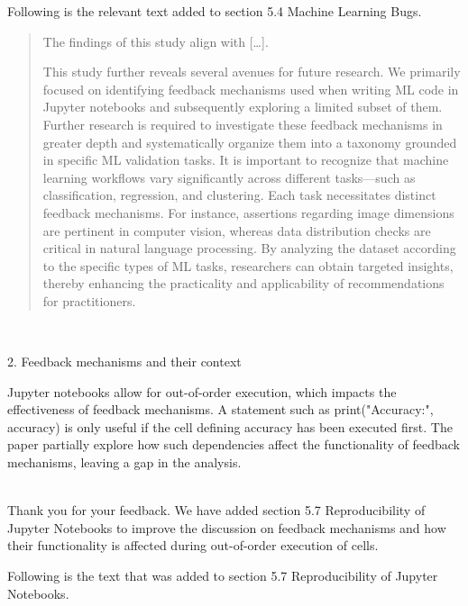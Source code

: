 \documentclass[11pt,fleqn]{article}
\newcommand{\eline}{\vspace*{.75\baselineskip}}
\newcommand{\Referee}[1]{\eline \noindent {\bf Reviewer comment #1:} \\}
\newcommand{\Us}{\eline \noindent {\bf Response:}\\}
\newenvironment{revcomment}[1][]
{\Referee{#1}\begin{rcomment}}
{\end{rcomment}}
\begin{document}
Following is the relevant text added to section 5.4 Machine Learning Bugs.

\begin{quote}
  The findings of this study align with [\ldots].

  This study further reveals several avenues for future research. We primarily focused on identifying feedback mechanisms used when writing ML code in Jupyter notebooks and subsequently exploring a limited subset of them. Further research is required to investigate these feedback mechanisms in greater depth and systematically organize them into a taxonomy grounded in specific ML validation tasks. It is important to recognize that machine learning workflows vary significantly across different tasks---such as classification, regression, and clustering. Each task necessitates distinct feedback mechanisms. For instance, assertions regarding image dimensions are pertinent in computer vision, whereas data distribution checks are critical in natural language processing. By analyzing the dataset according to the specific types of ML tasks, researchers can obtain targeted insights, thereby enhancing the practicality and applicability of recommendations for practitioners.
\end{quote}

\begin{revcomment}[2.7]
  2. Feedback mechanisms and their context

  Jupyter notebooks allow for out-of-order execution, which impacts the effectiveness of feedback mechanisms. A statement such as print("Accuracy:", accuracy) is only useful if the cell defining accuracy has been executed first. The paper partially explore how such dependencies affect the functionality of feedback mechanisms, leaving a gap in the analysis.

\end{revcomment}

\Us Thank you for your feedback. We have added section 5.7 Reproducibility of Jupyter Notebooks to improve the discussion on feedback mechanisms and how their functionality is affected during out-of-order execution of cells.

Following is the text that was added to section 5.7 Reproducibility of Jupyter Notebooks.
\end{document}
